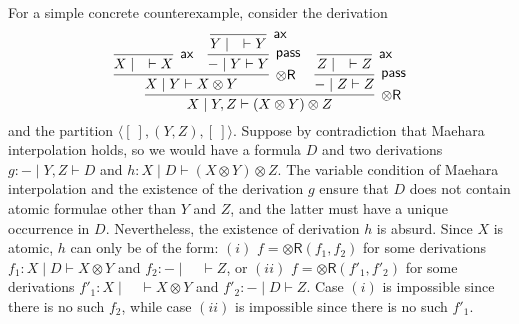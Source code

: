 \documentclass[sn-mathphys-num]{sn-jnl}%
\newcommand{\GG}{\Gamma}
\newcommand{\GD}{\Delta}
\newcommand{\vd}{\vdash}
\newcommand{\tl}{\otimes \mathsf{L}}
\newcommand{\tr}{\otimes\mathsf{R}}
\newcommand{\pass}{\mathsf{pass}}
\newcommand{\ax}{\mathsf{ax}}
\newcommand{\ot}{\otimes}
\newcommand{\SkNMILL}{$\mathtt{SkNMILL}$}
\newcommand{\mf}[1]{\mathsf{#1}}
\theoremstyle{thmstyleone}%
\theoremstyle{thmstyletwo}%
\theoremstyle{thmstylethree}%
\begin{document}
For a simple concrete counterexample, consider the derivation
\begin{equation*}
  \infer[\tr]{X \mid Y, Z \vd (X\ot Y)\ot Z}{
  \infer[\tr]{X \mid Y \vd X \ot Y}{
  \infer[\ax]{X \mid \quad \vd X}{}
  &
  \infer[\pass]{{-} \mid Y \vd Y}{
  \infer[\ax]{Y \mid \quad \vd Y}{}
  }
  }
  &
  \infer[\pass]{{-} \mid Z \vd Z}{
  \infer[\ax]{Z \mid \quad \vd Z}{}
  }
  }
\end{equation*}
and the partition $\langle [\ ], (Y,Z), [\ ]\rangle$. Suppose by contradiction that Maehara interpolation holds, so we would have a formula $D$ and two derivations $g: {-} \mid Y, Z \vd D$ and $h : X \mid D \vd (X\ot Y)\ot Z$.
The variable condition of Maehara interpolation and the existence of the derivation $g$ ensure that $D$ does not contain atomic formulae other than $Y$ and $Z$, and the latter must have a unique occurrence in $D$. Nevertheless, the existence of derivation $h$ is absurd. Since $X$ is atomic, $h$ can only be of the form: $(i)$ $f = \tr(f_1,f_2)$ for some derivations $f_1 : X \mid D \vd X \ot Y$ and $f_2 : {-} \mid \quad \vd Z$, or $(ii)$ $f = \tr(f'_1,f'_2)$ for some derivations $f'_1 : X \mid \quad \vd X \ot Y$ and $f'_2 : {-} \mid D \vd Z$. Case $(i)$ is impossible since there is no such $f_2$, while case $(ii)$ is impossible since there is no such $f'_1$.
\end{document}
